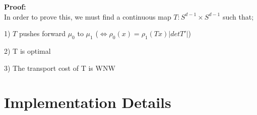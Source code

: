 \documentclass[]{article}
\begin{document}
\textbf{Proof:}\\

In order to prove this, we must find a continuous map $T:S^{d-1}\times S^{d-1}$ such that;

1) $T$ pushes forward $\mu_0$ to $\mu_1$ ($\iff \rho_0(x) = \rho_1(Tx)|det T'|$)

2) T is optimal 

3) The transport cost of T is WNW\\



\section{Implementation Details}

 \cite{https://doi.org/10.48550/arxiv.1907.05254}
\cite{https://doi.org/10.48550/arxiv.0801.2250}



\end{document}
